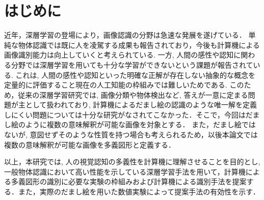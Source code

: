 \documentclass[twocolumn]{jarticle}     %
\newcommand{\1}{\mbox{1}\hspace{-0.25em}\mbox{l}}
\begin{document}
	
	


\section{はじめに}
近年，深層学習の登場により，画像認識の分野は急速な発展を遂げている．
単純な物体認識では既に人を凌駕する成果も報告されており，今後も計算機による画像識別能力は向上していくと考えられている. 一方, 人間の感性や認知に関わる分野では深層学習を用いても十分な学習ができないという課題が報告されている. これは, 人間の感性や認知といった明確な正解が存在しない抽象的な概念を定量的に評価すること現在の人工知能の枠組みでは難しいためである. 
このため，従来の深層学習研究では, 画像分類や物体検出など, 答えが一意に定まる問題が主として扱われており, 計算機によるだまし絵の認識のような唯一解を定義しにくい問題については十分な研究がなされてこなかった．そこで，今回はだまし絵のように複数の意味解釈が可能な画像を対象とする．
また，だまし絵ではないが, 意図せずそのような性質を持つ場合も考えられるため，以後本論文では複数の意味解釈が可能な画像を多義図形と定義する．\par
以上，本研究では, 人の視覚認知の多義性を計算機に理解させることを目的とし, 一般物体認識において高い性能を示している深層学習手法を用いて，計算機による多義図形の識別に必要な実験の枠組みおよび計算機による識別手法を提案する．また，実際のだまし絵を用いた数値実験によって提案手法の有効性を示す．
\par
\end{document}
